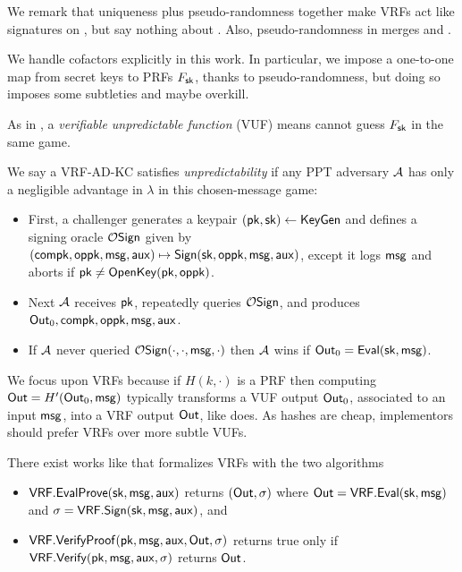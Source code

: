 We remark that uniqueness plus pseudo-randomness together make VRFs 
act like signatures on \msg, but say nothing about \aux.
Also, pseudo-randomness in \cite{vrf_micali} merges \Eval and \Sign.

We handle cofactors explicitly in this work.  In particular, we impose
a one-to-one map from secret keys \sk to PRFs $F_\mathsf{sk}$, thanks to
 pseudo-randomness, but doing so imposes some subtleties and maybe overkill.


As in \cite{agg_dkg}, a {\em verifiable unpredictable function} (VUF)
means \adv cannot guess $F_\mathsf{sk}$ in the same game.

\begin{definition}
We say a VRF-AD-KC satisfies {\em unpredictability} if 
any PPT adversary $\mathcal{A}$ has only a negligible advantage in $\lambda$
in this chosen-message game:
\begin{itemize}
 \item First, a challenger
  generates a keypair $(\mathsf{pk},\mathsf{sk}) \leftarrow {\ensuremath{\mathsf{KeyGen}}}$ and
  defines a signing oracle $\mathcal{O}\mathsf{Sign}$ given by
  $(\mathsf{compk},\mathsf{oppk},\mathsf{msg},\mathsf{aux}) \mapsto {\ensuremath{\mathsf{Sign}}}(\mathsf{sk},\mathsf{oppk},\mathsf{msg},\mathsf{aux})$,
   except it logs $\mathsf{msg}$ and aborts if $\mathsf{pk} \ne {\ensuremath{\mathsf{OpenKey}}}(\mathsf{pk},\mathsf{oppk})$.
 \item Next $\mathcal{A}$ receives $\mathsf{pk}$, repeatedly queries $\mathcal{O}\mathsf{Sign}$,
  and produces ${\mathsf{Out}}_0,\mathsf{compk},\mathsf{oppk},\mathsf{msg},\mathsf{aux}$. 
 \item If $\mathcal{A}$ never queried $\mathcal{O}\mathsf{Sign}(\cdot,\cdot,\mathsf{msg},\cdot)$ then
  $\mathcal{A}$ wins if ${\mathsf{Out}}_0 = {\mathsf{Eval}}(\mathsf{sk},\mathsf{msg})$.
\end{itemize}
\end{definition}

We focus upon VRFs because
if $H(k,\cdot)$ is a PRF then computing ${\mathsf{Out}} = H'({\mathsf{Out}}_0, \mathsf{msg})$
typically transforms a VUF output ${\mathsf{Out}}_0$, associated to an input $\mathsf{msg}$,
into a VRF output ${\mathsf{Out}}$, like \cite[Proposition 1]{vrf_micali} does.
As hashes are cheap, implementors should prefer VRFs over more subtle VUFs.


There exist works like \cite[\S3.2 $\fvrf$]{praos} that formalizes VRFs with the two algorithms
\begin{itemize}
\item ${\mathsf{VRF}}.{\mathsf{EvalProve}}(\mathsf{sk},\mathsf{msg},\mathsf{aux})$ returns $({\mathsf{Out}},\sigma)$ where ${\mathsf{Out}} = {\mathsf{VRF}}.{\mathsf{Eval}}(\mathsf{sk},\mathsf{msg})$ and $\sigma = {\mathsf{VRF}}.{\mathsf{Sign}}(\mathsf{sk},\mathsf{msg},\mathsf{aux})$, and
\item ${\mathsf{VRF}}.{\mathsf{VerifyProof}}(\mathsf{pk},\mathsf{msg},\mathsf{aux},{\mathsf{Out}},\sigma)$ returns true only if ${\mathsf{VRF}}.{\mathsf{Verify}}(\mathsf{pk},\mathsf{msg},\mathsf{aux},\sigma)$ returns ${\mathsf{Out}}$.
\end{itemize}

